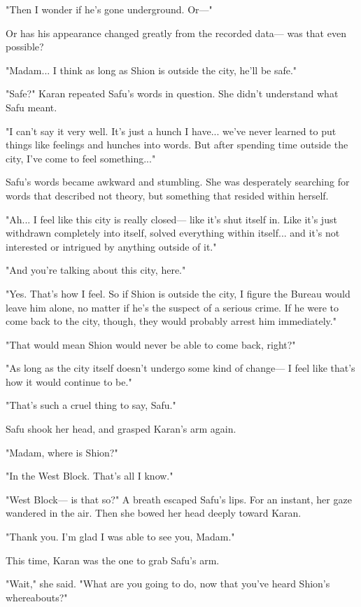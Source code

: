"Then I wonder if he's gone underground. Or---"

Or has his appearance changed greatly from the recorded data--- was that
even possible?

"Madam... I think as long as Shion is outside the city, he'll be safe."

"Safe?" Karan repeated Safu's words in question. She didn't understand
what Safu meant.

"I can't say it very well. It's just a hunch I have... we've never
learned to put things like feelings and hunches into words. But after
spending time outside the city, I've come to feel something..."

Safu's words became awkward and stumbling. She was desperately searching
for words that described not theory, but something that resided within
herself.

"Ah... I feel like this city is really closed--- like it's shut itself in.
Like it's just withdrawn completely into itself, solved everything
within itself... and it's not interested or intrigued by anything
outside of it."

"And you're talking about this city, here."

"Yes. That's how I feel. So if Shion is outside the city, I figure the
Bureau would leave him alone, no matter if he's the suspect of a serious
crime. If he were to come back to the city, though, they would probably
arrest him immediately."

"That would mean Shion would never be able to come back, right?"

"As long as the city itself doesn't undergo some kind of change--- I feel
like that's how it would continue to be."

"That's such a cruel thing to say, Safu."

Safu shook her head, and grasped Karan's arm again.

"Madam, where is Shion?"

"In the West Block. That's all I know."

"West Block--- is that so?" A breath escaped Safu's lips. For an instant,
her gaze wandered in the air. Then she bowed her head deeply toward
Karan.

"Thank you. I'm glad I was able to see you, Madam."

This time, Karan was the one to grab Safu's arm.

"Wait," she said. "What are you going to do, now that you've heard
Shion's whereabouts?"

